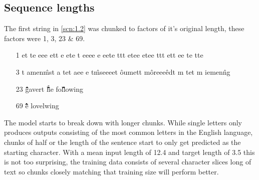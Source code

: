 \documentclass[sigconf]{acmart}
\begin{document}
\subsection{Sequence lengths}
The first string in \autoref{scn:1.2} was chunked to factors of it's original length, these factors were 1, 3, 23 \& 69.
\begin{itemize}
    \item [1] et te eee ett e ete   t eeee e   eete ttt etee etee ttt ett ee te tte
    \item [3] t amen\^mst a tet aee e t\^mseeeet \^oumett m\^oreee\^edt m tet m iemen\^ng
    \item [23] \^\^\^\^\^\^\^\^\^\^\^\^\^\^\^ gavert \^\^\^\^\^\^\^\^\^\^\^\^\^\^\^\^\^ he fol\^\^\^\^\^\^\^\^\^\^\^\^\^\^\^\^\^ lowing
    \item [69] \^\^\^\^\^\^\^\^\^\^\^\^\^\^\^\^\^\^\^\^\^\^\^\^\^\^\^\^\^\^\^\^\^\^\^\^\^\^\^\^\^\^\^\^\^\^\^\^\^\^\^\^\^\^\^\^\^\^ e lovelwing
\end{itemize}
The model starts to break down with longer chunks. While single letters only produces outputs consisting of the most common letters in the English language, chunks of half or the length of the sentence start to only get predicted as the starting character.
With a mean input length of 12.4 and target length of 3.5 this is not too surprising, the training data consists of several character slices long of text so chunks closely matching that training size will perform better.
\end{document}
